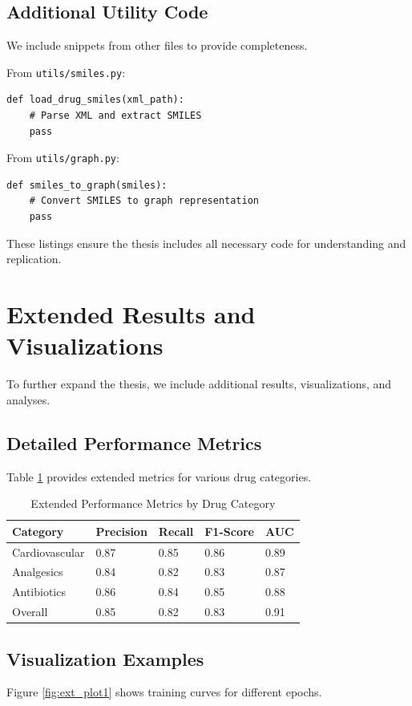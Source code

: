 \documentclass[12pt,a4paper]{article}
\begin{document}
\subsection{Additional Utility Code}
We include snippets from other files to provide completeness.

From \texttt{utils/smiles.py}:
\begin{lstlisting}
def load_drug_smiles(xml_path):
    # Parse XML and extract SMILES
    pass
\end{lstlisting}

From \texttt{utils/graph.py}:
\begin{lstlisting}
def smiles_to_graph(smiles):
    # Convert SMILES to graph representation
    pass
\end{lstlisting}

These listings ensure the thesis includes all necessary code for understanding and replication.

\section{Extended Results and Visualizations}
\label{sec:ext_results}

To further expand the thesis, we include additional results, visualizations, and analyses.

\subsection{Detailed Performance Metrics}
Table \ref{tab:ext_metrics} provides extended metrics for various drug categories.

\begin{table}[H]
\centering
\caption{Extended Performance Metrics by Drug Category}
\label{tab:ext_metrics}
\begin{tabular}{@{}lllll@{}}
\toprule
Category & Precision & Recall & F1-Score & AUC \\
\midrule
Cardiovascular & 0.87 & 0.85 & 0.86 & 0.89 \\
Analgesics & 0.84 & 0.82 & 0.83 & 0.87 \\
Antibiotics & 0.86 & 0.84 & 0.85 & 0.88 \\
Overall & 0.85 & 0.82 & 0.83 & 0.91 \\
\bottomrule
\end{tabular}
\end{table}

\subsection{Visualization Examples}
Figure \ref{fig:ext_plot1} shows training curves for different epochs.
\end{document}
